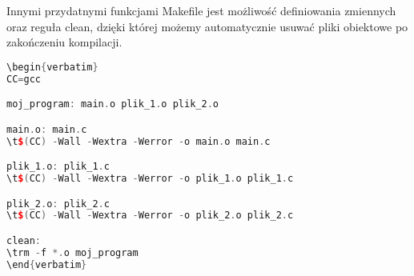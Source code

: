 \documentclass[notheorems, aspectratio=54]{beamer}
\begin{document}
\begin{frame}
Innymi przydatnymi funkcjami Makefile jest możliwość definiowania zmiennych oraz reguła clean,
dzięki której możemy automatycznie usuwać pliki obiektowe po zakończeniu kompilacji.

\begin{lstlisting}[language=C++]
\begin{verbatim}
CC=gcc

moj_program: main.o plik_1.o plik_2.o

main.o: main.c
\t$(CC) -Wall -Wextra -Werror -o main.o main.c

plik_1.o: plik_1.c
\t$(CC) -Wall -Wextra -Werror -o plik_1.o plik_1.c

plik_2.o: plik_2.c
\t$(CC) -Wall -Wextra -Werror -o plik_2.o plik_2.c

clean:
\trm -f *.o moj_program
\end{verbatim}
\end{lstlisting}

\end{frame}

\end{document}
